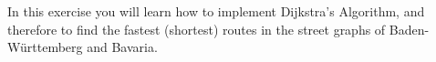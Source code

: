 In this exercise you will learn how to implement Dijkstra's Algorithm, and 
therefore to find the fastest (shortest) routes in the street graphs of 
Baden-Württemberg and Bavaria.